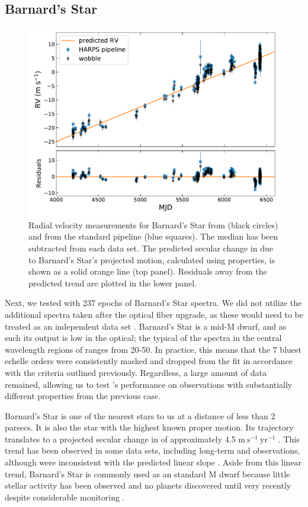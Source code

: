 \documentclass[twocolumn]{aastex62}
\newcommand{\Mdwarf}{Barnard's Star\xspace} %
\begin{document}
\subsection{\Mdwarf}
\label{s:Mdwarf}

\begin{figure}
\centering
\includegraphics[width=5in]{barnards_rvs}
\caption{Radial velocity measurements for \Mdwarf from \wobble (black circles) and from the standard \HARPS pipeline (blue squares). The median \RV has been subtracted from each data set. The predicted secular change in \RV due to \Mdwarf's projected motion, calculated using \gaia properties, is shown as a solid orange line (top panel). Residuals away from the predicted trend are plotted in the lower panel.}
\label{fig:barnards_rvs}
\end{figure}

Next, we tested \wobble with 237 epochs of \Mdwarf spectra. 
We did not utilize the additional spectra taken after the  optical fiber upgrade, as these would need to be treated as an independent data set \citep{LoCurto2015}. 
\Mdwarf is a mid-M dwarf, and as such its output is low in the optical; the typical \SNR of the spectra in the central wavelength regions of \HARPS ranges from 20-50. 
In practice, this means that the 7 bluest echelle orders were consistently masked and dropped from the fit in accordance with the \SNR criteria outlined previously. 
Regardless, a large amount of data remained, allowing us to test \wobble's performance on observations with substantially different properties from the previous case.

\Mdwarf is one of the nearest stars to us at a distance of less than 2 parsecs. 
It is also the star with the highest known proper motion. 
Its trajectory translates to a projected secular change in \RV of approximately 4.5 $\mathrm{m}~\mathrm{s}^{-1}~\mathrm{yr}^{-1}$ \citep{Kurster2003}. 
This trend has been observed in some data sets, including long-term \HARPS and  observations, although  \RVs were inconsistent with the predicted linear slope \citep{Kurster2003, Bonfils2013, Choi2013, Montet2014}. 
Aside from this linear trend, \Mdwarf is commonly used as an \RV standard M dwarf because little stellar activity has been observed and no planets discovered until very recently despite considerable \RV monitoring \citep{Ribas2018}. 
\end{document}
